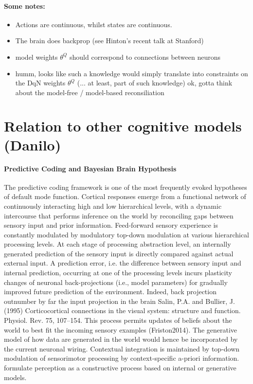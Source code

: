 \documentclass{article} %
\begin{document}
\paragraph*{Some notes:}
\begin{itemize}
  \item Actions are continuous, whilst states are continuous.
  \item The brain does backprop (see Hinton's recent talk at Stanford)
  \item model weights $\theta^Q$ should correspond to connections between neurons
\item humm, looks like such a knowledge would simply translate into constraints on the DqN weights $\theta^Q$ (... at least, part of such knowledge)
  ok, gotta think about the model-free / model-based reconsiliation
\end{itemize}
  

\section{Relation to other cognitive models (Danilo)}
\paragraph{Predictive Coding and Bayesian Brain Hypothesis}
The predictive coding framework 
is one of the most frequently evoked hypotheses of default mode function.
Cortical responses emerge from a functional network of continuously interacting high and low hierarchical levels,
with a dynamic intercourse that performs inference on the world by reconciling gaps between sensory input and prior information. 
Feed-forward sensory experience is constantly modulated by
modulatory top-down modulation at various hierarchical processing levels.
At each stage of processing abstraction level,
an internally generated prediction of the sensory input is
directly compared against actual external input.
A prediction error, i.e. the difference between sensory input
and internal prediction,
occurring at one of the processing levels
incurs plasticity changes of neuronal back-projections (i.e., model parameters)
for gradually improved future prediction of the environment.
Indeed,
back projection outnumber by far the input projection in the brain
Salin, P.A. and Bullier, J. (1995) Corticocortical connections in the visual system: structure and function. Physiol. Rev. 75, 107–154.
This process permits updates of beliefs about the world
to best fit the incoming sensory examples (Friston2014).
The generative model of how data are generated in the
world would hence be incorporated by
the current neuronal wiring.
Contextual integration is maintained by top-down modulation of sensorimotor
processing by context-specific a-priori information.
formulate perception as a constructive process
based on internal or generative models.
\end{document}
